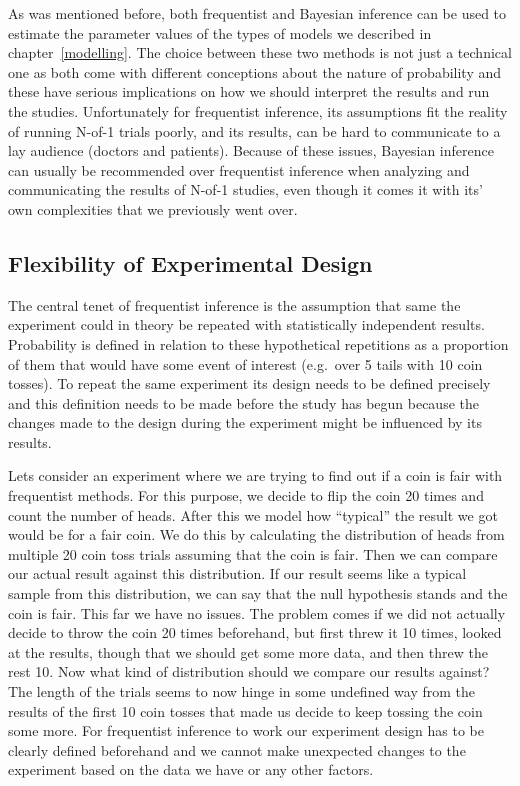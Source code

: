 \documentclass[12pt,a4paper,leqno]{report}
\theoremstyle{plain}
\theoremstyle{definition}
\theoremstyle{remark}
\begin{document}
As was mentioned before, both frequentist and Bayesian inference can be used to
estimate the parameter values of the types of models we described
in chapter\ \ref{modelling}. The choice between these two methods is not just a
technical one as both come with different conceptions about the nature of probability
and these have serious implications on how we should interpret the results and run the studies.
Unfortunately for frequentist inference, its assumptions fit the reality of running
N-of-1 trials poorly, and its results, can be hard to communicate to a lay
audience (doctors and patients). Because of these issues, Bayesian inference
can usually be recommended over frequentist inference when analyzing and
communicating the results of N-of-1 studies, even though it comes it with its'
own complexities that we previously went over.


\subsection{Flexibility of Experimental Design}\label{whybayes}

The central tenet of frequentist inference is the assumption that same the
experiment could in theory be repeated with statistically independent results. Probability
is defined in relation to these hypothetical repetitions as a proportion of them
that would have some event of interest (e.g.\ over 5 tails with 10 coin tosses).
To repeat the same experiment its design needs to be defined precisely and this
definition needs to be made before the study has begun because the changes made
to the design during the experiment might be influenced by its results.

Lets consider an experiment where we are trying to find out if a coin
is fair with frequentist methods. For this purpose, we decide to flip the coin 20 times
and count the number of heads. After this we model how ``typical'' the result we got
would be for a fair coin. We do this by calculating the distribution of heads from
multiple 20 coin toss trials
assuming that the coin is fair. Then we can compare our actual result against this
distribution. If our result seems like a typical sample from this distribution, we
can say that the null hypothesis stands and the coin is fair. This far we have no
issues. The problem comes if we did not actually decide to throw the coin 20 times
beforehand, but first threw it 10 times, looked at the results, though that we
should get some more data, and then threw the rest 10. Now what
kind of distribution should we compare our results against? The length of the trials
seems to now hinge in some undefined way from the results of the first 10 coin tosses
that made us decide to keep tossing the coin some more. For frequentist inference to
work our experiment design has to be clearly defined beforehand and we cannot make
unexpected changes to the experiment based on the data we have or any other factors.
\end{document}
